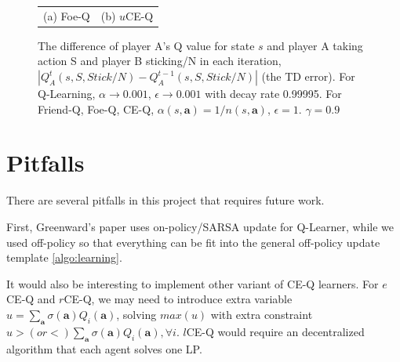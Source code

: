 \documentclass[conference]{IEEEtran}
\begin{document}
\begin{figure}
\begin{tabular}{cc}
		(a) Foe-Q & (b) $u$CE-Q \\
	\end{tabular}
	\caption{The difference of player A's Q value for state $s$ and player A taking action S and player B sticking/N in each iteration, $|Q_A^t(s, S, Stick/N) - Q_A^{t-1}(s, S, Stick/N)|$ (the TD error). For Q-Learning, $\alpha\rightarrow0.001$, $\epsilon\rightarrow0.001$ with decay rate 0.99995. For Friend-Q, Foe-Q, CE-Q, $\alpha(s,\mathbf{a})=1/n(s,\mathbf{a})$, $\epsilon=1$. $\gamma=0.9$}
	\label{fig:results}
\end{figure}

\section{Pitfalls}
There are several pitfalls in this project that requires future work.

First, Greenward's paper uses on-policy/SARSA update for Q-Learner, while we used off-policy so that everything can be fit into the general off-policy update template \ref{algo:learning}.

It would also be interesting to implement other variant of CE-Q learners. For $e$CE-Q and $r$CE-Q, we may need to introduce extra variable $u=\sum_{\mathbf{a}}\sigma(\mathbf{a}) Q_i(\mathbf{a})$, solving $max(u)$ with extra constraint $u>(or <) \sum_{\mathbf{a}}\sigma(\mathbf{a}) Q_i(\mathbf{a}), \forall i$. $l$CE-Q would require an decentralized algorithm that each agent solves one LP.

	


\end{document}
